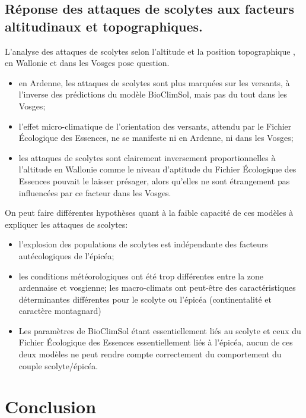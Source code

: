 \subsection{Réponse des attaques de scolytes aux facteurs altitudinaux et topographiques.}

L'analyse des attaques de scolytes selon l'altitude et la position topographique , en Wallonie et dans les Vosges pose question.
\begin{itemize}
	\item en Ardenne, les attaques de scolytes sont plus marquées sur les versants, à l'inverse des prédictions du modèle BioClimSol, mais pas du tout dans les Vosges;
	
	\item l'effet micro-climatique de l'orientation des versants, attendu par le Fichier Écologique des Essences, ne se manifeste ni en Ardenne, ni dans les Vosges;
	
	\item les attaques de scolytes sont clairement inversement proportionnelles à l'altitude en Wallonie comme le niveau d'aptitude du Fichier Écologique des Essences pouvait le laisser présager, alors qu'elles ne sont étrangement pas influencées par ce facteur dans les Vosges.
	
\end{itemize}
On peut faire différentes hypothèses quant à la faible capacité de ces modèles à expliquer les attaques de scolytes:

\begin{itemize}
	\item l'explosion des populations de scolytes est indépendante des facteurs autécologiques de l'épicéa;
	\item les conditions météorologiques ont été trop différentes entre la zone ardennaise et vosgienne; les macro-climats ont peut-être des caractéristiques déterminantes différentes pour le scolyte ou l'épicéa (continentalité et caractère montagnard)
	\item Les paramètres de BioClimSol étant essentiellement liés au scolyte et ceux du Fichier Écologique des Essences essentiellement liés à l'épicéa, aucun de ces deux modèles ne peut rendre compte correctement du comportement du couple    scolyte/épicéa.
\end{itemize}

\newpage
\section{Conclusion}

